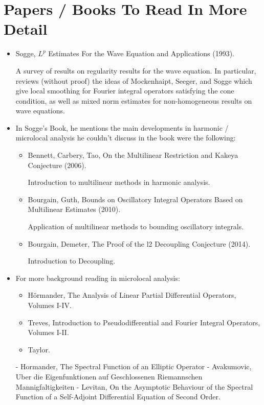 \chapter{Papers / Books To Read In More Detail}

\begin{itemize}
    \item Sogge, $L^p$ Estimates For the Wave Equation and Applications (1993).

    A survey of results on regularity results for the wave equation. In particular, reviews (without proof) the ideas of Mockenhaipt, Seeger, and Sogge which give local smoothing for Fourier integral operators satisfying the cone condition, as well as mixed norm estimates for non-homogeneous results on wave equations.

    \item In Sogge's Book, he mentions the main developments in harmonic / microlocal analysis he couldn't discuss in the book were the following:
    \begin{itemize}
    \item Bennett, Carbery, Tao, On the Multilinear Restriction and Kakeya Conjecture (2006).

    Introduction to multilinear methods in harmonic analysis.

    \item Bourgain, Guth, Bounds on Oscillatory Integral Operators Based on Multilinear Estimates (2010).

    Application of multilinear methods to bounding oscillatory integrals.

    \item Bourgain, Demeter, The Proof of the l2 Decoupling Conjecture (2014).

    Introduction to Decoupling.
    \end{itemize}

    \item For more background reading in microlocal analysis:
    \begin{itemize}
        \item H\"{o}rmander, The Analysis of Linear Partial Differential Operators, Volumes I-IV.
        \item Treves, Introduction to Pseudodifferential and Fourier Integral Operators, Volumes I-II.
        \item Taylor.
    \end{itemize}

    - Hormander, The Spectral Function of an Elliptic Operator
    - Avakumovic, Uber die Eigenfunktionen auf Geschlossenen Riemannschen Mannigfaltigkeiten
    - Levitan, On the Asymptotic Behaviour of the Spectral Function of a Self-Adjoint Differential Equation of Second Order.


\end{itemize}
